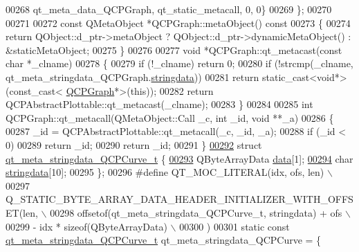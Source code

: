 \begin{DoxyCode}
00268       qt\_meta\_data\_QCPGraph,  qt\_static\_metacall, 0, 0\}
00269 \};
00270 
00271 
00272 \textcolor{keyword}{const} QMetaObject *QCPGraph::metaObject()\textcolor{keyword}{ const}
00273 \textcolor{keyword}{}\{
00274     \textcolor{keywordflow}{return} QObject::d\_ptr->metaObject ? QObject::d\_ptr->dynamicMetaObject() : &staticMetaObject;
00275 \}
00276 
00277 \textcolor{keywordtype}{void} *QCPGraph::qt\_metacast(\textcolor{keyword}{const} \textcolor{keywordtype}{char} *\_clname)
00278 \{
00279     \textcolor{keywordflow}{if} (!\_clname) \textcolor{keywordflow}{return} 0;
00280     \textcolor{keywordflow}{if} (!strcmp(\_clname, qt\_meta\_stringdata\_QCPGraph.\hyperlink{a00067_a8d599799df5356cb10dc7a790a0e26a2}{stringdata}))
00281         \textcolor{keywordflow}{return} \textcolor{keyword}{static\_cast<}\textcolor{keywordtype}{void}*\textcolor{keyword}{>}(\textcolor{keyword}{const\_cast<} \hyperlink{a00031}{QCPGraph}*\textcolor{keyword}{>}(\textcolor{keyword}{this}));
00282     \textcolor{keywordflow}{return} QCPAbstractPlottable::qt\_metacast(\_clname);
00283 \}
00284 
00285 \textcolor{keywordtype}{int} QCPGraph::qt\_metacall(QMetaObject::Call \_c, \textcolor{keywordtype}{int} \_id, \textcolor{keywordtype}{void} **\_a)
00286 \{
00287     \_id = QCPAbstractPlottable::qt\_metacall(\_c, \_id, \_a);
00288     \textcolor{keywordflow}{if} (\_id < 0)
00289         \textcolor{keywordflow}{return} \_id;
00290     \textcolor{keywordflow}{return} \_id;
00291 \}
\hypertarget{a00067_source_l00292}{}\hyperlink{a00067}{00292} \textcolor{keyword}{struct }\hyperlink{a00067_d3/d2a/a00195}{qt\_meta\_stringdata\_QCPCurve\_t} \{
\hypertarget{a00067_source_l00293}{}\hyperlink{a00067_ac2243b1095d588f9864242ffc67f432f}{00293}     QByteArrayData \hyperlink{a00067_ac2243b1095d588f9864242ffc67f432f}{data}[1];
\hypertarget{a00067_source_l00294}{}\hyperlink{a00067_ad141d5092cc25ae43c6c60a782ca04ee}{00294}     \textcolor{keywordtype}{char} \hyperlink{a00067_ad141d5092cc25ae43c6c60a782ca04ee}{stringdata}[10];
00295 \};
00296 \textcolor{preprocessor}{#define QT\_MOC\_LITERAL(idx, ofs, len) \(\backslash\)}
00297 \textcolor{preprocessor}{    Q\_STATIC\_BYTE\_ARRAY\_DATA\_HEADER\_INITIALIZER\_WITH\_OFFSET(len, \(\backslash\)}
00298 \textcolor{preprocessor}{    offsetof(qt\_meta\_stringdata\_QCPCurve\_t, stringdata) + ofs \(\backslash\)}
00299 \textcolor{preprocessor}{        - idx * sizeof(QByteArrayData) \(\backslash\)}
00300 \textcolor{preprocessor}{    )}
00301 \textcolor{keyword}{static} \textcolor{keyword}{const} \hyperlink{a00067_d3/d2a/a00195}{qt\_meta\_stringdata\_QCPCurve\_t} qt\_meta\_stringdata\_QCPCurve = \{

\end{DoxyCode}

